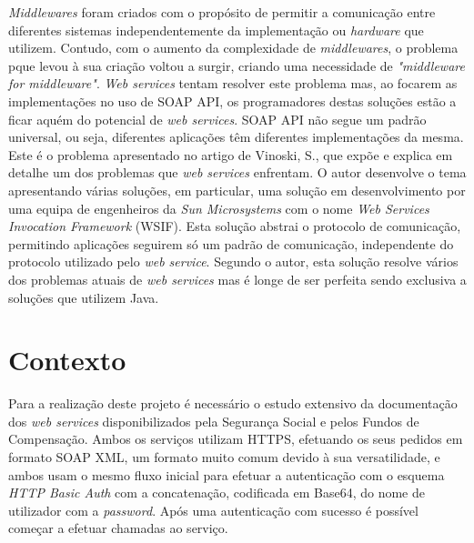 \documentclass[sigplan]{acmart}
\begin{document}
\textit{Middlewares} foram criados com o propósito de permitir a comunicação entre diferentes sistemas independentemente da implementação ou \textit{hardware} que utilizem. Contudo, com o aumento da complexidade de \textit{middlewares}, o problema pque levou à sua criação voltou a surgir, criando uma necessidade de \textit{"middleware for middleware"}\cite{vinoskiMiddleware}. \textit{Web services} tentam resolver este problema mas, ao focarem as implementações no uso de SOAP API, os programadores destas soluções estão a ficar aquém do potencial de \textit{web services}. SOAP API não segue um padrão universal, ou seja, diferentes aplicações têm diferentes implementações da mesma. Este é o problema apresentado no artigo de Vinoski, S.\cite{vinoskiIntegration}, que expõe e explica em detalhe um dos problemas que \textit{web services} enfrentam. O autor desenvolve o tema apresentando várias soluções, em particular, uma solução em desenvolvimento por uma equipa de engenheiros da \textit{Sun Microsystems} com o nome \textit{Web Services Invocation Framework} (WSIF). Esta solução abstrai o protocolo de comunicação, permitindo aplicações seguirem só um padrão de comunicação, independente do protocolo utilizado pelo \textit{web service}. Segundo o autor, esta solução resolve vários dos problemas atuais de \textit{web services} mas é longe de ser perfeita sendo exclusiva a soluções que utilizem Java.

\section{Contexto} \label{sec:data}

Para a realização deste projeto é necessário o estudo extensivo da documentação dos \textit{web services} disponibilizados pela Segurança Social e pelos Fundos de Compensação. Ambos os serviços utilizam HTTPS, efetuando os seus pedidos em formato SOAP XML, um formato muito comum devido à sua versatilidade, e ambos usam o mesmo fluxo inicial para efetuar a autenticação com o esquema \textit{HTTP Basic Auth} com a concatenação, codificada em Base64, do nome de utilizador com a \textit{password}. Após uma autenticação com sucesso é possível começar a efetuar chamadas ao serviço.
\end{document}
